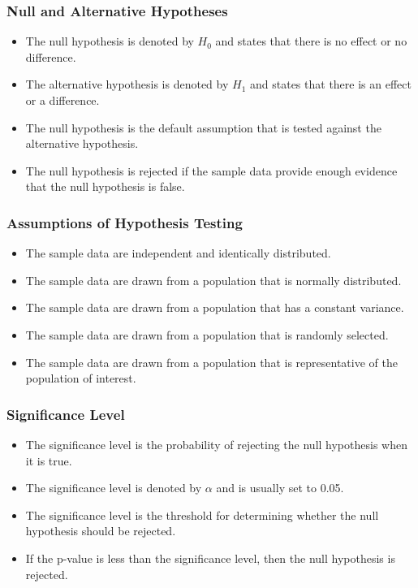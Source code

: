 \documentclass[serif, 9pt, aspectratio=32]{beamer}
\begin{document}
\begin{frame}
    \frametitle{Null and Alternative Hypotheses}
    \begin{itemize}
        \setlength{\itemsep}{2em}
        \item The null hypothesis is denoted by $H_0$ and states that there is no effect or no difference.
        \item The alternative hypothesis is denoted by $H_1$ and states that there is an effect or a difference.
        \item The null hypothesis is the default assumption that is tested against the alternative hypothesis.
        \item The null hypothesis is rejected if the sample data provide enough evidence that the null hypothesis is false.
    \end{itemize}
\end{frame}

\begin{frame}
    \frametitle{Assumptions of Hypothesis Testing}
    \begin{itemize}
        \setlength{\itemsep}{2em}
        \item The sample data are independent and identically distributed.
        \item The sample data are drawn from a population that is normally distributed.
        \item The sample data are drawn from a population that has a constant variance.
        \item The sample data are drawn from a population that is randomly selected.
        \item The sample data are drawn from a population that is representative of the population of interest.
    \end{itemize}
\end{frame}

\begin{frame}
    \frametitle{Significance Level}
    \begin{itemize}
        \setlength{\itemsep}{2em}
        \item The significance level is the probability of rejecting the null hypothesis when it is true.
        \item The significance level is denoted by $\alpha$ and is usually set to 0.05.
        \item The significance level is the threshold for determining whether the null hypothesis should be rejected.
        \item If the p-value is less than the significance level, then the null hypothesis is rejected.
    \end{itemize}
\end{frame}
\end{document}
